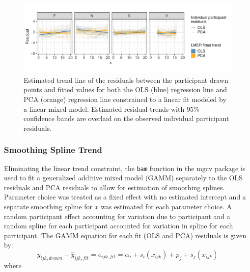 \documentclass[12pt]{article}
\begin{document}
\begin{figure}[tbp]

{\centering \includegraphics[width=1\linewidth,]{Eye-Fitting-Straight-Lines-in-the-Modern-Era_files/figure-latex/eyefitting-lmer-residualplots-1} 

}

\caption{Estimated trend line of the residuals between the participant drawn points and fitted values for both the OLS (blue) regression line and PCA (orange) regression line constrained to a linear fit modeled by a linear mixed model. Estimated residual trends with 95\% confidence bands are overlaid on the observed individual participant residuals.}\label{fig:eyefitting-lmer-residualplots}
\end{figure}

\hypertarget{smoothing-spline-trend}{%
\subsubsection{Smoothing Spline Trend}\label{smoothing-spline-trend}}

Eliminating the linear trend constraint, the \texttt{bam} function in
the mgcv package \citep{mgcv1, mgcv2, mgcv3, mgcv4, mgcv5} is used to
fit a generalized additive mixed model (GAMM) separately to the OLS
residuals and PCA residuals to allow for estimation of smoothing
splines. Parameter choice was treated as a fixed effect with no
estimated intercept and a separate smoothing spline for \(x\) was
estimated for each parameter choice. A random participant effect
accounting for variation due to participant and a random spline for each
participant accounted for variation in spline for each participant. The
GAMM equation for each fit (OLS and PCA) residuals is given by:
\begin{equation}
y_{ijk, drawn} - \hat y_{ijk, fit} = e_{ijk,fit} = \alpha_i + s_{i}(x_{ijk}) + p_{j} + s_{j}(x_{ijk})
\end{equation} \noindent where
\end{document}
